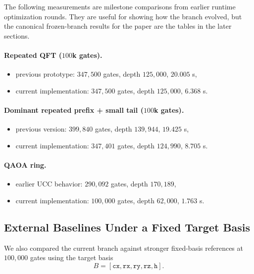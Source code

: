 \documentclass[11pt]{article}
\begin{document}
The following measurements are milestone comparisons from earlier runtime optimization rounds. They are useful for showing how the branch evolved, but the canonical frozen-branch results for the paper are the tables in the later sections.

\paragraph{Repeated QFT ($100$k gates).}
\begin{itemize}[leftmargin=1.5em]
    \item previous prototype: $347{,}500$ gates, depth $125{,}000$, $20.005$ s,
    \item current implementation: $347{,}500$ gates, depth $125{,}000$, $6.368$ s.
\end{itemize}

\paragraph{Dominant repeated prefix + small tail ($100$k gates).}
\begin{itemize}[leftmargin=1.5em]
    \item previous version: $399{,}840$ gates, depth $139{,}944$, $19.425$ s,
    \item current implementation: $347{,}401$ gates, depth $124{,}990$, $8.705$ s.
\end{itemize}

\paragraph{QAOA ring.}
\begin{itemize}[leftmargin=1.5em]
    \item earlier UCC behavior: $290{,}092$ gates, depth $170{,}189$,
    \item current implementation: $100{,}000$ gates, depth $62{,}000$, $1.763$ s.
\end{itemize}

\subsection{External Baselines Under a Fixed Target Basis}

We also compared the current branch against stronger fixed-basis references at $100{,}000$ gates using the target basis
\[
B = [\texttt{cx}, \texttt{rx}, \texttt{ry}, \texttt{rz}, \texttt{h}].
\]
\end{document}
